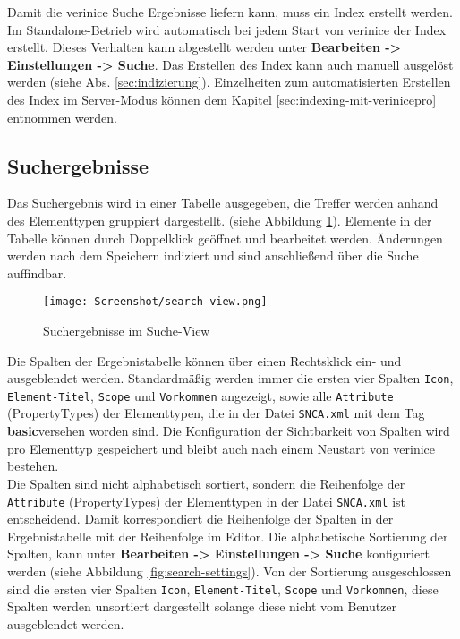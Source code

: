 \documentclass[a4paper,10pt]{book}
\begin{document}
Damit die verinice Suche Ergebnisse liefern kann, muss ein Index
erstellt werden. Im Standalone-Betrieb wird automatisch bei jedem
Start von verinice der Index erstellt. Dieses Verhalten kann
abgestellt werden unter \textbf{Bearbeiten -> Einstellungen ->
  Suche}. Das Erstellen des Index kann auch manuell ausgelöst werden
(siehe Abs. \ref{sec:indizierung}). Einzelheiten zum automatisierten
Erstellen des Index im Server-Modus können dem Kapitel
\ref{sec:indexing-mit-verinicepro} entnommen werden.

\subsection{Suchergebnisse}
\label{sec:suchergebnisse}

Das Suchergebnis wird in einer Tabelle ausgegeben, die Treffer
werden anhand des Elementtypen gruppiert dargestellt. (siehe Abbildung
\ref{fig:search-view}). Elemente in der Tabelle können durch
Doppelklick geöffnet und bearbeitet werden. Änderungen
werden nach dem Speichern indiziert
und sind anschließend über die Suche auffindbar.\\

\begin{figure}[ht]
  \centering
  \texttt{[image: Screenshot/search-view.png]}
  \caption{Suchergebnisse im Suche-View}
  \label{fig:search-view}
\end{figure}

Die Spalten der Ergebnistabelle können über einen Rechtsklick ein- und
ausgeblendet werden. Standardmäßig werden immer die ersten vier
Spalten \texttt{Icon}, \texttt{Element-Titel}, \texttt{Scope} und
\texttt{Vorkommen} angezeigt, sowie alle \texttt{Attribute}
(PropertyTypes) der Elementtypen, die in der Datei \texttt{SNCA.xml}
mit dem Tag \glqq \textbf{basic}\grqq versehen worden sind. Die
Konfiguration der Sichtbarkeit von Spalten wird pro Elementtyp
gespeichert und bleibt auch nach einem Neustart von verinice bestehen.\\

Die Spalten sind nicht alphabetisch sortiert, sondern die
Rei\-hen\-fol\-ge der \texttt{Attribute} (Proper\-ty\-Types) der
Elementtypen in der Datei \texttt{SNCA.xml} ist entscheidend. Damit
korrespondiert die Reihenfolge der Spalten in der Ergebnistabelle mit
der Reihenfolge im Editor. Die alphabetische Sortierung der Spalten,
kann unter \textbf{Bearbeiten -> Einstellungen -> Suche} konfiguriert
werden (siehe Abbildung \ref{fig:search-settings}). Von der Sortierung
ausgeschlossen sind die ersten vier Spalten \texttt{Icon},
\texttt{Element-Titel}, \texttt{Scope} und \texttt{Vorkommen}, diese
Spalten werden unsortiert dargestellt solange diese nicht vom Benutzer
ausgeblendet werden.
\end{document}
